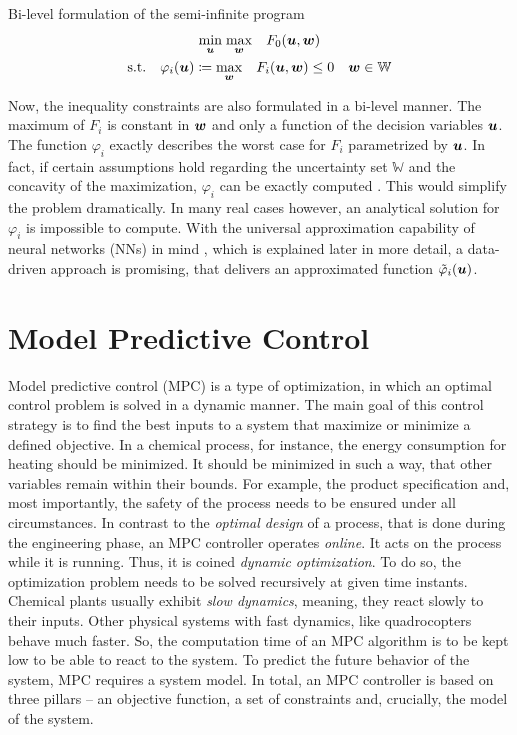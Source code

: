 \begin{definition} Bi-level formulation of the semi-infinite program
    \label{theory:def: bi-level program}
    \[
    \begin{gathered}
        \underset{{\bm{u}}}{\min} \; \underset{{\bm{w}}}{\max} \quad F_0({\bm{u}}, {\bm{w}}) \\
        \text{s.t.} \quad \varphi_i({\bm{u}}) \coloneq \underset{{\bm{w}}}{\max} \quad F_i({\bm{u}}, {\bm{w}}) \leq 0
        \quad {\bm{w}} \in \mathbb{W}
    \end{gathered}
    \]
\end{definition}

\noindent
Now, the inequality constraints are also formulated in a bi-level manner. The maximum of $F_i$ is 
constant in ${\bm{w}}$ and only a function of the decision variables ${\bm{u}}$. The function $\varphi_i$
exactly describes the worst case for $F_i$ parametrized by ${\bm{u}}$. In fact, if certain assumptions hold
regarding the uncertainty set $\mathbb{W}$ and the concavity of the maximization,
$\varphi_i$ can be exactly computed \cite{diehl2025}. This would simplify the problem dramatically.
In many real cases however, an analytical solution for $\varphi_i$ is impossible to compute.
With the universal approximation capability of neural networks (NNs) in mind \cite{hornik1990}, 
which is explained later in more detail,
a data-driven approach is promising, that delivers an approximated function $\tilde{\varphi}_i({\bm{u}})$.


\section{Model Predictive Control}

Model predictive control (MPC) is a type of optimization, in which an optimal control problem is solved
in a dynamic manner. The main goal of this control strategy is to find the best inputs to a system that
maximize or minimize a defined objective. In a chemical process, for instance, the energy consumption
for heating should be minimized. It should be minimized in such a way, that other variables remain 
within their bounds. For example, the product specification and, most importantly, the safety of the process
needs to be ensured under all circumstances. In contrast to the \emph{optimal design} of a process, that 
is done during the engineering phase, an MPC controller operates \emph{online}. It acts on the process
while it is running. Thus, it is coined \emph{dynamic optimization}. To do so, the optimization
problem needs to be solved recursively at given time instants.
Chemical plants usually exhibit \emph{slow dynamics}, meaning, they react slowly to their inputs.
Other physical systems with fast dynamics, like quadrocopters behave much faster. So, the
computation time of an MPC algorithm is to be kept low \cite{salzmann2023} to be able to react to the system.
To predict the future behavior of the system, MPC requires a system model.
\newline
\newline
In total, an MPC controller is based on three pillars – an objective function, a set of constraints and, crucially,
the model of the system.

